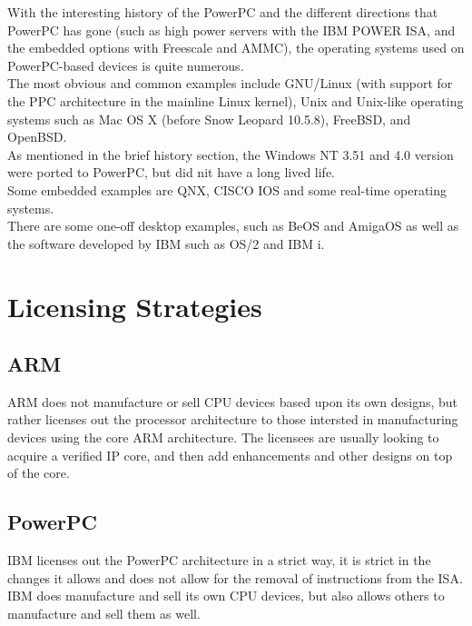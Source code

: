 \documentclass[letterpaper,10pt,titlepage]{article}
\begin{document}
With the interesting history of the PowerPC and the different directions that PowerPC has gone (such as high power servers with the IBM POWER ISA, and the embedded options with Freescale and AMMC), the operating systems used on PowerPC-based devices is quite numerous.\\

The most obvious and common examples include GNU/Linux (with support for the PPC architecture in the mainline Linux kernel), Unix and Unix-like operating systems such as Mac OS X (before Snow Leopard 10.5.8), FreeBSD, and OpenBSD.\\

As mentioned in the brief history section, the Windows NT 3.51 and 4.0 version were ported to PowerPC, but did nit have a long lived life.\\

Some embedded examples are QNX, CISCO IOS and some real-time operating systems.\\

There are some one-off desktop examples, such as BeOS and AmigaOS as well as the software developed by IBM such as OS/2 and IBM i.

\section{Licensing Strategies}
\subsection{ARM}

ARM does not manufacture or sell CPU devices based upon its own designs, but rather licenses out the processor architecture to those intersted in manufacturing devices using the core ARM architecture. The licensees are usually looking to acquire a verified IP core, and then add enhancements and other designs on top of the core.

\subsection{PowerPC}

IBM licenses out the PowerPC architecture in a strict way, it is strict in the changes it allows and does not allow for the removal of instructions from the ISA. IBM does manufacture and sell its own CPU devices, but also allows others to manufacture and sell them as well.


\end{document}
